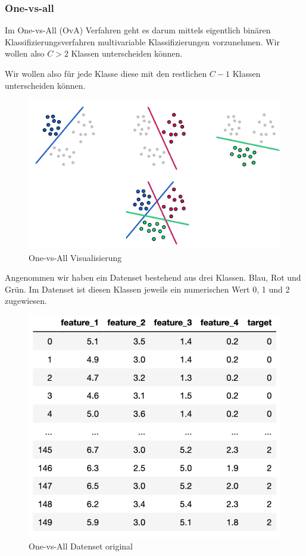 \subsubsection{One-vs-all}
Im One-vs-All (OvA) Verfahren geht es darum mittels eigentlich binären Klassifizierungsverfahren multivariable Klassifizierungen vorzunehmen. Wir wollen also $C > 2$ Klassen unterscheiden können.

Wir wollen also für jede Klasse diese mit den restlichen $C-1$ Klassen unterscheiden können.


\begin{figure}[H]
	\centering
	\label{fig:one_vs_all_vis}
	\includegraphics[scale=0.5]{figures/OvA}
	\caption{One-vs-All Visualisierung}
\end{figure}


Angenommen wir haben ein Datenset bestehend aus drei Klassen. Blau, Rot und Grün. Im Datenset ist diesen Klassen jeweils ein numerischen Wert 0, 1 und 2 zugewiesen.


\begin{figure}[H]
	\centering
	\label{fig:one_vs_all_ds_orig}
	\includegraphics[scale=0.5]{figures/OvA_datenset_original}
	\caption{One-vs-All Datenset original}
\end{figure}


